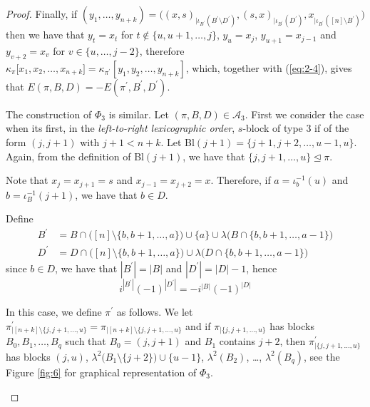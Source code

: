 \documentclass{amsart}
\begin{document}
\begin{proof}
 
  
  Finally, if $(y_1, \dots, y_{n+k}) =
  \big(
  (x, s)_{ | \iota_{B^\prime} (B^\prime \setminus D^\prime)} , (s, x)_{| \iota_{B^\prime} (D^\prime)} , x_{| \iota_{B^\prime}([n] \setminus {B^\prime} )}
  \big) $
  then we have that 
  $y_t = x_t$ for $ t \notin \{u, u+1, \dots, j\}$,
  $y_u = x_j $, $y_{u+1} = x_{j-1} $ and $ y_{v+2} = x_v $ for $ v \in \{ u, \dots, j-2\}$, 
  therefore
  $\kappa_\pi\big[x_1, x_2, \dots, x_{n+k}] = \kappa_{\pi^\prime}[ y_1, y_2, \dots, y_{n+k}]$, 
  which, together with (\ref{eq:2-4}), gives that
  $ E(\pi, B, D) = -E(\pi^\prime, B^\prime, D^\prime)$.
  
  
  The construction of $\Phi_3 $ is similar. Let 
  $(\pi, B, D) \in \mathcal{A}_3 $. First we consider the case when 
   its first, in the
  \emph{left-to-right lexicographic order}, $s$-block of type 3 if of the form 
  $(j, j+1)$ with $j+1 < n+k$.
  Let
   \textrm{Bl}$(j+1) = \{j+1, j+2, \dots, u-1, u\}$. 
   Again, from the definition of \textrm{Bl}$(j+1)$,  we have that 
  $\{j, j+1, \dots, u\}  \trianglelefteq \pi$.
  
  Note that 
  $ x_j = x_{j+1}= s $
   and 
   $ x_{j-1}=x_{j+2} = x $. 
   Therefore, if 
   $ a = \iota_b^{-1}(u)$
    and  
  $ b = \iota_B^{-1}(j+1)$, 
  we have that 
  $b \in  D$. 
 
  Define 
  \begin{align*}
  B^\prime &= B \cap \big( [n]\setminus \{ b, b+1, \dots, a\}\big) \cup \{ a\} \cup \lambda\big(B \cap\{ b, b+1, \dots, a-1\}\big) \\
  D^\prime & = D \cap \big( [n] \setminus \{ b, b+1, \dots, a\} \big) \cup \lambda\big(D \cap\{ b, b+1, \dots, a-1\}\big) 
  \end{align*}
  since $ b \in D $, we have that $ |B^\prime| = | B | $ 
  and $ | D^\prime | = |D | -1 $, hence
  \begin{equation}\label{eq:3-5}
  i^{| B^\prime |}(-1)^{| D^\prime|} = - i^{| B |}(-1)^{| D|}
  \end{equation}
  
  
  In this case, we define $\pi^\prime$ as follows. We let
  $\pi^\prime_{| [n+k] \setminus \{j, j+1, \dots, u\}} = 
 \pi_{| [n+k] \setminus \{j, j+1, \dots, u\}} $
 and if
 $ \pi_{| \{j, j+1, \dots, u\} } $ 
 has blocks
 $ B_0, B_1, \dots, B_q $ 
 such that 
 $ B_0 = (j, j+1)$ 
 and $ B_1$ contains $j+2$, then
 $\pi^\prime_{| \{ j, j+1, \dots, u\}}$
 has blocks
 $(j, u)$, $\lambda^2 \big(B_1 \setminus\{ j+2\} ) \cup \{ u-1 \} $, 
 $\lambda^2(B_2)$, \dots, $\lambda^2(B_q)$, see the Figure \ref{fig:6} for graphical representation of $\Phi_3$.
   \begin{center}
   	{
   	\setlength{\intextsep}{-3pt}
   	\begin{figure}[H]
   	\begin{tikzpicture}[
   		scale=0.8,
   		baseline=(current bounding box.center),
   		every node/.style={font=\small},
   		var/.style={
   			draw,
   			circle,
   			minimum size=5mm,
   			inner sep=1pt,
   			thick
   		},
   		>=Stealth
   		]
   		

\end{tikzpicture}
\end{figure}}
\end{center}
\end{proof}
\end{document}
